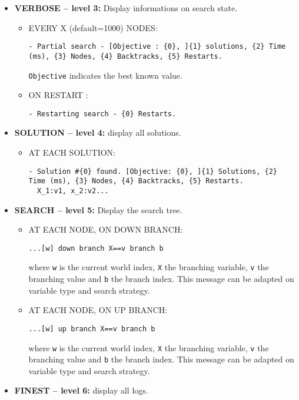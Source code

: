 \begin{itemize}
	\item \textbf{VERBOSE -- level 3:} Display informations on search state.
		\begin{itemize}
			\item EVERY X (default=1000) NODES:
			\begin{lstlisting}
- Partial search - [Objective : {0}, ]{1} solutions, {2} Time (ms), {3} Nodes, {4} Backtracks, {5} Restarts.
			\end{lstlisting}
			\texttt{Objective} indicates the best known value.

			\item ON RESTART : 
			\begin{lstlisting}
- Restarting search - {0} Restarts.
			\end{lstlisting}
		\end{itemize}

	\item \textbf{SOLUTION -- level 4:} display all solutions.
		\begin{itemize}
			\item AT EACH SOLUTION:
			\begin{lstlisting}
- Solution #{0} found. [Objective: {0}, ]{1} Solutions, {2} Time (ms), {3} Nodes, {4} Backtracks, {5} Restarts.
  X_1:v1, x_2:v2...
			\end{lstlisting}
		\end{itemize}

	\item \textbf{SEARCH -- level 5:} Display the search tree.
		\begin{itemize}
			\item AT EACH NODE, ON DOWN BRANCH:
			\begin{lstlisting}
...[w] down branch X==v branch b
			\end{lstlisting}
where \texttt{w} is the current world index, \texttt{X} the branching variable, \texttt{v} the branching value and \texttt{b} the branch index. This message can be adapted on variable type and search strategy.

			\item AT EACH NODE, ON UP BRANCH:
			\begin{lstlisting}
...[w] up branch X==v branch b
			\end{lstlisting}
where \texttt{w} is the current world index, \texttt{X} the branching variable, \texttt{v} the branching value and \texttt{b} the branch index. This message can be adapted on variable type and search strategy.
		\end{itemize}

	\item \textbf{FINEST -- level 6:} display all logs.

\end{itemize}

